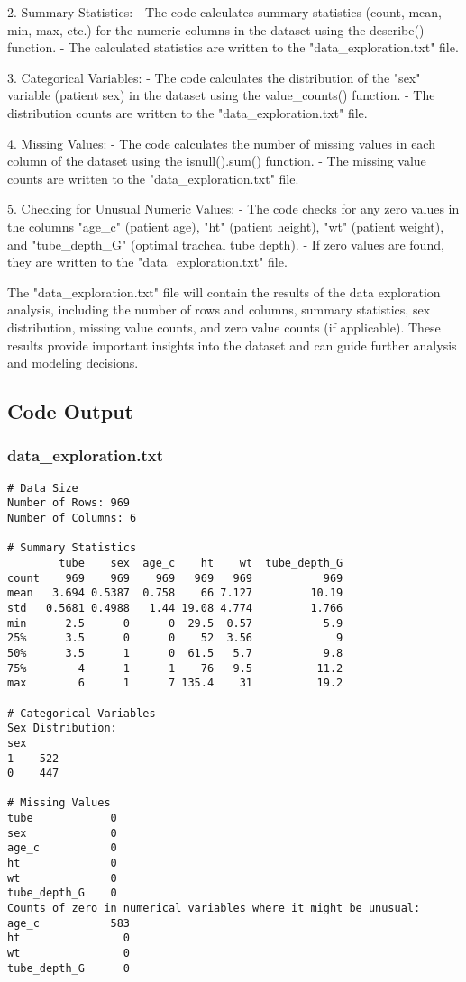 \documentclass[11pt]{article}
\begin{document}
2. Summary Statistics:
   - The code calculates summary statistics (count, mean, min, max, etc.) for the numeric columns in the dataset using the describe() function.
   - The calculated statistics are written to the "data\_exploration.txt" file.

3. Categorical Variables:
   - The code calculates the distribution of the "sex" variable (patient sex) in the dataset using the value\_counts() function.
   - The distribution counts are written to the "data\_exploration.txt" file.

4. Missing Values:
   - The code calculates the number of missing values in each column of the dataset using the isnull().sum() function.
   - The missing value counts are written to the "data\_exploration.txt" file.

5. Checking for Unusual Numeric Values:
   - The code checks for any zero values in the columns "age\_c" (patient age), "ht" (patient height), "wt" (patient weight), and "tube\_depth\_G" (optimal tracheal tube depth).
   - If zero values are found, they are written to the "data\_exploration.txt" file.

The "data\_exploration.txt" file will contain the results of the data exploration analysis, including the number of rows and columns, summary statistics, sex distribution, missing value counts, and zero value counts (if applicable). These results provide important insights into the dataset and can guide further analysis and modeling decisions.

\subsection{Code Output}

\subsubsection*{data\_exploration.txt}

\begin{Verbatim}[tabsize=4]
# Data Size
Number of Rows: 969
Number of Columns: 6

# Summary Statistics
        tube    sex  age_c    ht    wt  tube_depth_G
count    969    969    969   969   969           969
mean   3.694 0.5387  0.758    66 7.127         10.19
std   0.5681 0.4988   1.44 19.08 4.774         1.766
min      2.5      0      0  29.5  0.57           5.9
25%      3.5      0      0    52  3.56             9
50%      3.5      1      0  61.5   5.7           9.8
75%        4      1      1    76   9.5          11.2
max        6      1      7 135.4    31          19.2

# Categorical Variables
Sex Distribution:
sex
1    522
0    447

# Missing Values
tube            0
sex             0
age_c           0
ht              0
wt              0
tube_depth_G    0
Counts of zero in numerical variables where it might be unusual:
age_c           583
ht                0
wt                0
tube_depth_G      0

\end{Verbatim}
\end{document}
